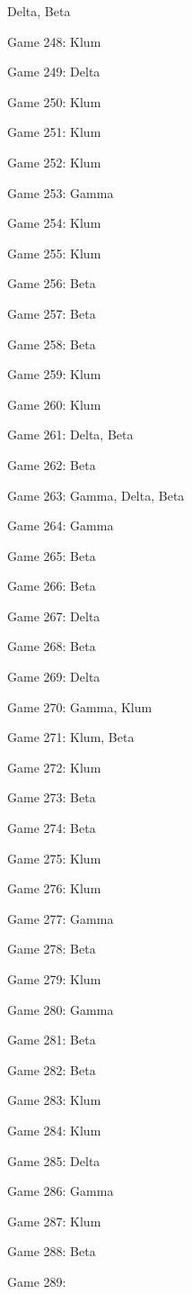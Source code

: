 \documentclass{article}
\begin{document}
\begin{multicols}{3}
\begin{compactitem}
Delta, Beta
\item Game 248:
Klum
\item Game 249:
Delta
\item Game 250:
Klum
\item Game 251:
Klum
\item Game 252:
Klum
\item Game 253:
Gamma
\item Game 254:
Klum
\item Game 255:
Klum
\item Game 256:
Beta
\item Game 257:
Beta
\item Game 258:
Beta
\item Game 259:
Klum
\item Game 260:
Klum
\item Game 261:
Delta, Beta
\item Game 262:
Beta
\item Game 263:
Gamma, Delta, Beta
\item Game 264:
Gamma
\item Game 265:
Beta
\item Game 266:
Beta
\item Game 267:
Delta
\item Game 268:
Beta
\item Game 269:
Delta
\item Game 270:
Gamma, Klum
\item Game 271:
Klum, Beta
\item Game 272:
Klum
\item Game 273:
Beta
\item Game 274:
Beta
\item Game 275:
Klum
\item Game 276:
Klum
\item Game 277:
Gamma
\item Game 278:
Beta
\item Game 279:
Klum
\item Game 280:
Gamma
\item Game 281:
Beta
\item Game 282:
Beta
\item Game 283:
Klum
\item Game 284:
Klum
\item Game 285:
Delta
\item Game 286:
Gamma
\item Game 287:
Klum
\item Game 288:
Beta
\item Game 289:

\end{compactitem}
\end{multicols}
\end{document}
